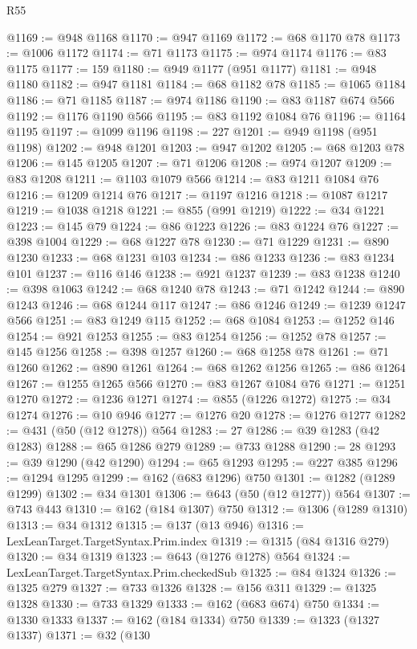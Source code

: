 \begin{lexlean}{R55}
\begin{coremodule}
{{{{{{{{{{{{{{{{{{{{{{{{{{{{{{{{{{{{{{{{{{{{{{{{{{{{{{{{{{{{{{@1169 := @948 @1168
@1170 := @947 @1169
@1172 := @68 @1170 @78
@1173 := @1006 @1172
@1174 := @71 @1173
@1175 := @974 @1174
@1176 := @83 @1175
@1177 := 159
@1180 := @949 @1177 (@951 @1177)
@1181 := @948 @1180
@1182 := @947 @1181
@1184 := @68 @1182 @78
@1185 := @1065 @1184
@1186 := @71 @1185
@1187 := @974 @1186
@1190 := @83 @1187 @674 @566
@1192 := @1176 @1190 @566
@1195 := @83 @1192 @1084 @76
@1196 := @1164 @1195
@1197 := @1099 @1196
@1198 := 227
@1201 := @949 @1198 (@951 @1198)
@1202 := @948 @1201
@1203 := @947 @1202
@1205 := @68 @1203 @78
@1206 := @145 @1205
@1207 := @71 @1206
@1208 := @974 @1207
@1209 := @83 @1208
@1211 := @1103 @1079 @566
@1214 := @83 @1211 @1084 @76
@1216 := @1209 @1214 @76
@1217 := @1197 @1216
@1218 := @1087 @1217
@1219 := @1038 @1218
@1221 := @855 (@991 @1219)
@1222 := @34 @1221
@1223 := @145 @79
@1224 := @86 @1223
@1226 := @83 @1224 @76
@1227 := @398 @1004
@1229 := @68 @1227 @78
@1230 := @71 @1229
@1231 := @890 @1230
@1233 := @68 @1231 @103
@1234 := @86 @1233
@1236 := @83 @1234 @101
@1237 := @116 @146
@1238 := @921 @1237
@1239 := @83 @1238
@1240 := @398 @1063
@1242 := @68 @1240 @78
@1243 := @71 @1242
@1244 := @890 @1243
@1246 := @68 @1244 @117
@1247 := @86 @1246
@1249 := @1239 @1247 @566
@1251 := @83 @1249 @115
@1252 := @68 @1084
@1253 := @1252 @146
@1254 := @921 @1253
@1255 := @83 @1254
@1256 := @1252 @78
@1257 := @145 @1256
@1258 := @398 @1257
@1260 := @68 @1258 @78
@1261 := @71 @1260
@1262 := @890 @1261
@1264 := @68 @1262 @1256
@1265 := @86 @1264
@1267 := @1255 @1265 @566
@1270 := @83 @1267 @1084 @76
@1271 := @1251 @1270
@1272 := @1236 @1271
@1274 := @855 (@1226 @1272)
@1275 := @34 @1274
@1276 := @10 @946
@1277 := @1276 @20
@1278 := @1276 @1277
@1282 := @431 (@50 (@12 @1278)) @564
@1283 := 27
@1286 := @39 @1283 (@42 @1283)
@1288 := @65 @1286 @279
@1289 := @733 @1288
@1290 := 28
@1293 := @39 @1290 (@42 @1290)
@1294 := @65 @1293
@1295 := @227 @385
@1296 := @1294 @1295
@1299 := @162 (@683 @1296) @750
@1301 := @1282 (@1289 @1299)
@1302 := @34 @1301
@1306 := @643 (@50 (@12 @1277)) @564
@1307 := @743 @443
@1310 := @162 (@184 @1307) @750
@1312 := @1306 (@1289 @1310)
@1313 := @34 @1312
@1315 := @137 (@13 @946)
@1316 := LexLeanTarget.TargetSyntax.Prim.index
@1319 := @1315 (@84 @1316 @279)
@1320 := @34 @1319
@1323 := @643 (@1276 @1278) @564
@1324 := LexLeanTarget.TargetSyntax.Prim.checkedSub
@1325 := @84 @1324
@1326 := @1325 @279
@1327 := @733 @1326
@1328 := @156 @311
@1329 := @1325 @1328
@1330 := @733 @1329
@1333 := @162 (@683 @674) @750
@1334 := @1330 @1333
@1337 := @162 (@184 @1334) @750
@1339 := @1323 (@1327 @1337)
@1371 := @32
    (@130
}}}}}}}}}}}}}}}}}}}}}}}}}}}}}}}}}}}}}}}}}}}}}}}}}}}}}}}}}}}}}}
\end{coremodule}
\end{lexlean}
